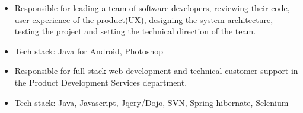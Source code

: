 \documentclass[10pt,a4paper]{altacv}
\begin{document}
\begin{itemize}
\item Responsible for leading a team of software developers, reviewing their code, user experience of the product(UX), designing the system architecture, testing the project and setting the technical direction of the team.
\item Tech stack: Java for Android, Photoshop
\end{itemize}

\divider


\begin{itemize}
\item Responsible for full stack web development and technical customer support in the Product Development Services department.
\item Tech stack: Java, Javascript, Jqery/Dojo, SVN, Spring hibernate, Selenium
 \end{itemize}
\end{document}
